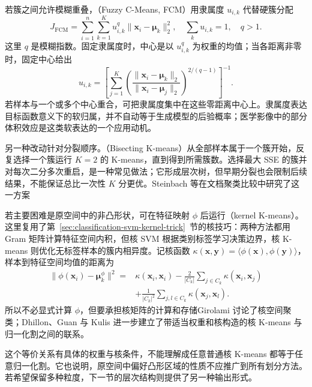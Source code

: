 \Needspace{45mm}
若簇之间允许模糊重叠，（Fuzzy C-Means, FCM）用隶属度 $u_{i,k}$ 代替硬簇分配
\begin{equation}
 J_{\mathrm{FCM}}
 =\sum_{i=1}^n\sum_{k=1}^K
 u_{i,k}^{q}\lVert\bm{x}_i-\bm{\mu}_k\rVert_2^2,
 \quad \sum_k u_{i,k}=1,\quad q>1.
 \label{eq:clustering-fcm}
\end{equation}
这里 $q$ 是模糊指数。固定隶属度时，中心是以 $u_{i,k}^q$ 为权重的均值；当各距离非零时，固定中心给出
\[
 u_{i,k}=
 \left[
 \sum_{j=1}^K
 \left(\frac{\lVert\bm{x}_i-\bm{\mu}_k\rVert_2}
 {\lVert\bm{x}_i-\bm{\mu}_j\rVert_2}\right)^{2/(q-1)}
 \right]^{-1}.
\]
若样本与一个或多个中心重合，可把隶属度集中在这些零距离中心上。隶属度表达目标函数意义下的软归属，并不自动等于生成模型的后验概率；医学影像中的部分体积效应是这类软表达的一个应用动机。

另一种改动针对分裂顺序。（Bisecting K-means）从全部样本属于一个簇开始，反复选择一个簇运行 $K=2$ 的 K-means，直到得到所需簇数。选择最大 SSE 的簇并对每次二分多次重启，是一种常见做法；它形成层次树，但早期分裂也会限制后续结果，不能保证总比一次性 $K$ 分更优。Steinbach 等在文档聚类比较中研究了这一方案

\Needspace{105mm}
若主要困难是原空间中的非凸形状，可在特征映射 $\phi$ 后运行（kernel K-means）。这里复用了第~\ref{sec:classification-svm-kernel-trick}~节的核技巧：两种方法都用 Gram 矩阵计算特征空间内积，但核 SVM 根据类别标签学习决策边界，核 K-means 则优化无标签样本的簇内相异度。记核函数 $\kappa(\bm{x},\bm{y})=\langle\phi(\bm{x}),\phi(\bm{y})\rangle$，样本到特征空间均值的距离为
\begin{equation}
 \begin{aligned}
 \lVert\phi(\bm{x}_i)-\bm{\mu}_k^\phi\rVert^2
 ={}&\kappa(\bm{x}_i,\bm{x}_i)
 -\frac{2}{|C_k|}\sum_{j\in C_k}\kappa(\bm{x}_i,\bm{x}_j)\\
 &+\frac{1}{|C_k|^2}
   \sum_{j,l\in C_k}\kappa(\bm{x}_j,\bm{x}_l).
 \end{aligned}
 \label{eq:clustering-kernel-kmeans}
\end{equation}
所以不必显式计算 $\phi$，但要承担核矩阵的计算和存储Girolami 讨论了核空间聚类；Dhillon、Guan 与 Kulis 进一步建立了带适当权重和核构造的核 K-means 与归一化割之间的联系。

这个等价关系有具体的权重与核条件，不能理解成任意普通核 K-means 都等于任意归一化割。它也说明，原空间中偏好凸形区域的性质不应推广到所有划分方法。若希望保留多种粒度，下一节的层次结构则提供了另一种输出形式。

